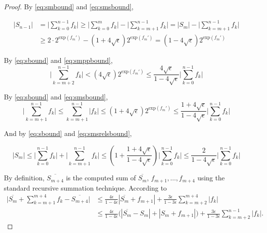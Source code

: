 \documentclass[12pt]{article}
\providecommand{\exp}{\ensuremath{\text{exp}}}
\theoremstyle{definition}
\numberwithin{equation}{section}
\numberwithin{figure}{section}
\begin{document}
\begin{proof}
      By  \eqref{eq:smbound} and \eqref{eq:smsbound},

      \begin{align}
        |S_{n-1}| & = \bigl|\sum\limits_{k = 0}^{n - 1} f_k\bigr| \geq \bigl|\sum\limits_{k = 0}^{m} f_k\bigr| - \bigl|\sum\limits_{k = m + 1}^{n - 1} f_k\bigr| = |S_m| - \bigl|\sum\limits_{k = m + 1}^{n - 1} f_k\bigr| \nonumber \\
        & \geq 2 \cdot 2^{\exp(f_{m}')} - \left(1 + 4 \sqrt\epsilon\right) 2^{\exp(f_m')} = \left(1 - 4 \sqrt\epsilon\right) 2^{\exp(f_m')}
        \label{eq:sbound}
      \end{align}

      By  \eqref{eq:sbound} and \eqref{eq:smppbound},
      \begin{equation}
        \bigl|\sum \limits_{k = m + 2}^{n - 1} f_k\bigr| < \left(4 \sqrt{\epsilon}\right) 2^{\exp(f_m')} \leq \frac{4 \sqrt\epsilon}{1 - 4  \sqrt\epsilon}\bigl|\sum\limits_{k = 0}^{n - 1}f_k\bigr|
        \label{eq:smpprelsbound}
      \end{equation}

      By  \eqref{eq:sbound} and \eqref{eq:smsbound},
      \begin{equation}
        \bigl|\sum\limits_{k = m + 1}^{n - 1}f_k\bigr| \leq \sum\limits_{k = m + 1}^{n - 1}|f_k| \leq \left(1 + 4  \sqrt\epsilon\right)2^{\exp(f_m')}\leq \frac{1 + 4  \sqrt\epsilon}{1 - 4  \sqrt\epsilon}\bigl|\sum\limits_{k = 0}^{n - 1}f_k\bigr|
        \label{eq:smsrelsbound}
      \end{equation}

      And by \eqref{eq:sbound} and \eqref{eq:smsrelsbound},

      \begin{equation}
        |S_m| \leq \bigl|\sum\limits_{k = 0}^{n - 1}f_k\bigr| + \bigl|\sum\limits_{k = m + 1}^{n - 1} f_k\bigr| \leq \left(1 + \frac{1 + 4  \sqrt\epsilon}{1 - 4  \sqrt\epsilon}\right)\bigl|\sum\limits_{k = 0}^{n - 1}f_k\bigr| \leq \frac{2}{1 - 4  \sqrt\epsilon}\bigl|\sum\limits_{k = 0}^{n - 1}f_k\bigr|
        \label{eq:smrelsbound}
      \end{equation}

    By definition, $\overline{S_{m+4}}$ is the computed sum of
    $\overline{S_m}$, $f_{m+1}, \ldots, f_{m+4}$ using the standard recursive summation technique.
    According to \cite[Equation 1.2, 2.4]{higham}
    \begin{align*}
        \bigl|\overline{S_m} + \sum_{k=m+1}^{m+4}f_k - \overline{S_{m+4}}\bigr|
        & \leq \frac{4\epsilon}{1-4\epsilon} \left|\overline{S_m} + f_{m+1}\right| + \frac{3\epsilon}{1-3\epsilon} \sum_{k=m+2}^{m+4}|f_k| \\
        & \leq \frac{4\epsilon}{1-4\epsilon} \bigl(\left|\overline{S_m} - S_m\right| + |S_m + f_{m+1}|\bigr)
            + \frac{3\epsilon}{1-3\epsilon} \sum_{k=m+2}^{n-1}|f_k|.
    \end{align*}


\end{proof}
\end{document}
